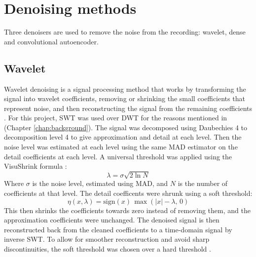 \documentclass[ %
                    author={Rzan Alkabier},
                    supervisor={Dr. Zahraa Abdallah},
                    degree={MSc},
                     title={Denoising Extracellular Recording for Spike Detection and Classification on Single Channels},
                    subtitle={Does denoising improve detection and classification performance?},
                      type={},
                      year={2026}]{dissertation}
\begin{document}
\section{Denoising methods}
Three denoisers are used to remove the noise from the recording: wavelet, dense and convolutional autoencoder. 
\subsection{Wavelet}
Wavelet denoising is a signal processing method that works by transforming the signal into wavelet coefficients, removing or shrinking the small coefficients that represent noise, and then reconstructing the signal from the remaining coefficients \cite{wei_wavelet_2005, donoho_minimax_1998}. For this project, SWT was used over DWT for the reasons mentioned in (Chapter \ref{chap:background}). The signal was decomposed using Daubechies 4 to decomposition level 4 to give approximation and detail at each level. Then the noise level was estimated at each level using the same MAD estimator on the detail coefficients at each level. A universal threshold was applied using the VisuShrink formula \cite{donoho_ideal_1994, donoho_-noising_1995}:
\begin{equation}
    \lambda = \sigma \sqrt{2 \ln N}
    \label{VisuShrink}
\end{equation}
Where $\sigma$ is the noise level, estimated using MAD, and $N$ is the number of coefficients at that level. The detail coefficents were shrunk using a soft threshold:
\begin{equation}
    \eta(x, \lambda) = \text{sign}(x)\, \max(|x| - \lambda,\, 0)
    \label{Soft thresholding}
\end{equation}
This then shrinks the coefficients towards zero instead of removing them, and the approximation coefficients were unchanged. The denoised signal is then reconstructed back from the cleaned coefficients to a time-domain signal by inverse SWT. To allow for smoother reconstruction and avoid sharp discontinuities, the soft threshold was chosen over a hard threshold \cite{donoho_-noising_1995,zhang_improved_2019}. 
\end{document}
